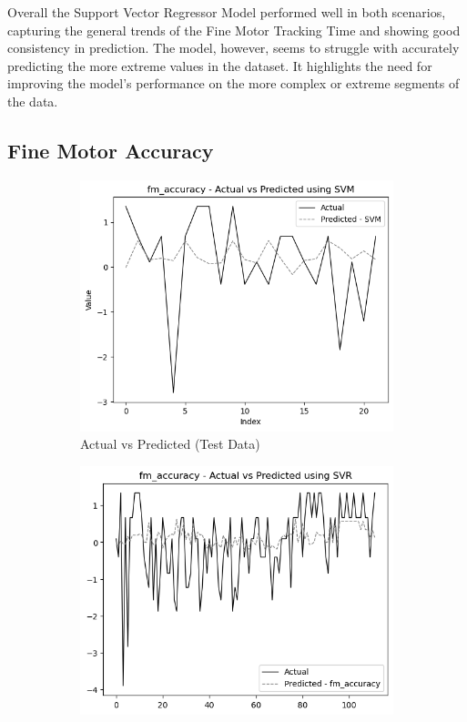 Overall the Support Vector Regressor Model performed well in both scenarios, capturing the general trends of the Fine Motor Tracking Time and showing good consistency in prediction.
The model, however, seems to struggle with accurately predicting the more extreme values in the dataset. It highlights the need for improving the model's performance on the more complex
or extreme segments of the data.

\subsection*{Fine Motor Accuracy}

\begin{figure}[htbp]
    \centering
    \begin{subfigure}[b]{0.49\textwidth}
        \centering
        \includegraphics[width=\textwidth]{images/test_data_fine_motor_accuracy.png}
        \caption{Actual vs Predicted (Test Data)}
        \label{fig:actual_vs_predicted_fm_accuracy_test}
    \end{subfigure}\hfill
    \begin{subfigure}[b]{0.49\textwidth}
        \centering
        \includegraphics[width=\textwidth]{images/all_data_fine_motor_accuracy.png}

\end{subfigure}
\end{figure}
